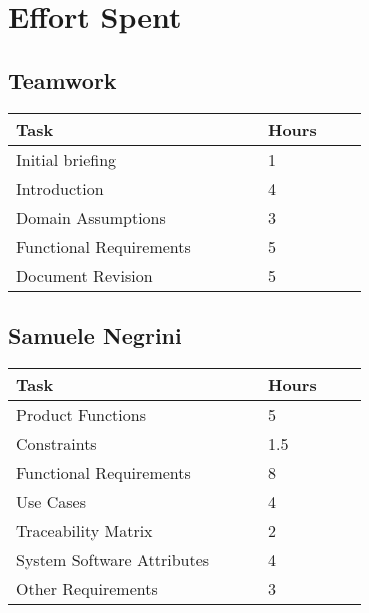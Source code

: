 \chapter{Effort Spent}

\section{Teamwork}
\vspace{2mm}
\begin{center}
    \begin{tabular}{@{}p{0.5\linewidth} p{0.2\linewidth}@{}}
        \hline
        \textbf{Task} & \textbf{Hours} \\ \hline
        Initial briefing & 1 \\ \hline
        Introduction & 4 \\ \hline
        Domain Assumptions & 3 \\ \hline
        Functional Requirements & 5 \\ \hline
        Document Revision & 5 \\ \hline
    \end{tabular}
\end{center}

\section{Samuele Negrini}
\vspace{2mm}
\begin{center}
	\begin{tabular}{@{}p{0.5\linewidth} p{0.2\linewidth}@{}}
		\hline
		\textbf{Task} & \textbf{Hours} \\ \hline
		Product Functions & 5 \\ \hline
		Constraints & 1.5 \\ \hline
        Functional Requirements & 8 \\ \hline
        Use Cases & 4 \\ \hline
        Traceability Matrix & 2 \\ \hline
        System Software Attributes & 4 \\ \hline
        Other Requirements & 3 \\ \hline
	\end{tabular}
\end{center}

